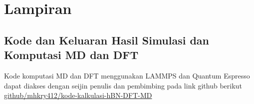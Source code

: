 % 

\chapter{Lampiran}



\section{Kode dan Keluaran Hasil Simulasi dan Komputasi MD dan DFT }
Kode komputasi MD dan DFT menggunakan LAMMPS dan Quantum Espresso dapat diakses dengan seijin penulis dan pembimbing pada link github berikut \href{https://github.com/mhkry412/Kode_Kalkulasi_hBN_DFT_MD}{github/mhkry412/kode-kalkulasi-hBN-DFT-MD}





